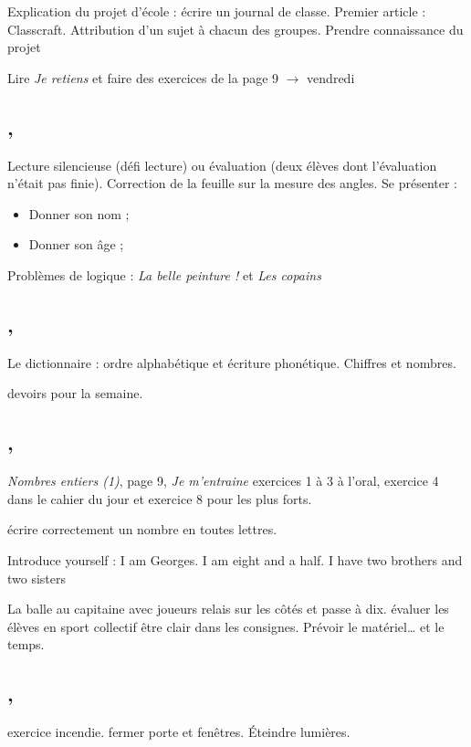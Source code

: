 \documentclass{article}
\begin{document}
	\dIs\cpr{} Explication du projet d’école : écrire un journal de classe. Premier article : Classcraft. Attribution d’un sujet à chacun des groupes.
	\obj Prendre connaissance du projet
	
	\dev
	\sdl\bcb\cma\nec Lire \textit{Je retiens} et faire des exercices de la page 9 $\rightarrow$ vendredi
	
	
	\subsection{ \sep}
	\dIs\cfr{} Lecture silencieuse (défi lecture) ou évaluation (deux élèves dont l’évaluation n’était pas finie).
	\dIs\cma{} Correction de la feuille sur la mesure des angles.
	\dIs\cen{} Se présenter :
	\begin{itemize}
		\item Donner son nom ;
		\item Donner son âge ;
	\end{itemize}
	\dIs\cma{} Problèmes de logique : \textit{La belle peinture !} et \textit{Les copains}
	
	
	\subsection{ \sep}
	\dIs\cfr{} Le dictionnaire : ordre alphabétique et écriture phonétique.
	\dIs\cma{} Chiffres et nombres.
	
	\dev devoirs pour la semaine.
	
	
	\subsection{ \sep}
	\dIs\cma{} \textit{Nombres entiers (1)}, page 9, \textit{Je m’entraine} exercices 1 à 3 à l’oral, exercice 4 dans le cahier du jour et exercice 8 pour les plus forts.
	
	\obj écrire correctement un nombre en toutes lettres.
	
	\dIs\cen{} Introduce yourself : I am Georges. I am eight and a half. I have two brothers and two sisters
	
	\dIs\csp{} La balle au capitaine avec joueurs relais sur les côtés et passe à dix.
	\obj évaluer les élèves en sport collectif
	\bil être clair dans les consignes. Prévoir le matériel\dots{} et le temps.
	
	
	\subsection{ \sep}
	\nte exercice incendie.
	\bil fermer porte et fenêtres. Éteindre lumières.
	
\end{document}
